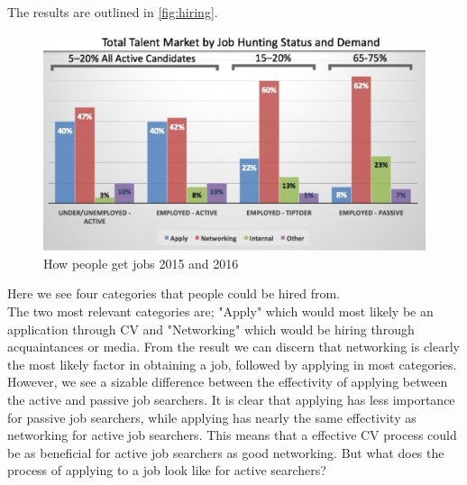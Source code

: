 The results are outlined in \vref{fig:hiring}.
\begin{figure}[H]
   \centering
   \includegraphics[scale = 0.5]{figures/hiringpeople}
   \caption{How people get jobs 2015 and 2016 \cite{Networking}}
   \label{fig:hiring}
 \end{figure}

Here we see four categories that people could be hired from. \\
The two most relevant categories are; "Apply" which would most likely be an application through CV and "Networking" which would be hiring through acquaintances or media.
From the result we can discern that networking is clearly the most likely factor in obtaining a job, followed by applying in most categories.
However, we see a sizable difference between the effectivity of applying between the active and passive job searchers. 
It is clear that applying has less importance for passive job searchers, while applying has nearly the same effectivity as networking for active job searchers. 
This means that a effective CV process could be as beneficial for active job searchers as good networking.
But what does the process of applying to a job look like for active searchers? \\

